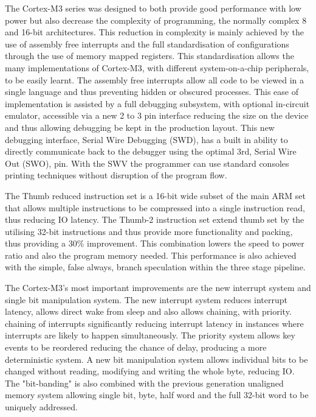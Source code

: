 The Cortex-M3 series was designed to both provide good performance with low power but also
decrease the complexity of programming, the normally complex 8 and 16-bit architectures. This
reduction in complexity is mainly achieved by the use of assembly free interrupts and the full
standardisation of configurations through the use of memory mapped registers. This standardisation
allows the many implementations of Cortex-M3, with different system-on-a-chip peripherals, to be
easily learnt. The assembly free interrupts allow all code to be viewed in a single language and thus
preventing hidden or obscured processes. This ease of implementation is assisted by a full debugging
subsystem, with optional in-circuit emulator, accessible via a new 2 to 3 pin interface reducing the
size on the device and thus allowing debugging be kept in the production layout. This new debugging
interface, Serial Wire Debugging (SWD), has a built in ability to directly communicate back to the
debugger using the optimal 3rd, Serial Wire Out (SWO), pin. With the SWV the programmer can use
standard consoles printing techniques without disruption of the program flow.


The Thumb reduced instruction set is a 16-bit wide subset of the main ARM set that allows multiple
instructions to be compressed into a single instruction read, thus reducing IO latency. The Thumb-2
instruction set extend thumb set by the utilising 32-bit instructions and thus provide more
functionality and packing, thus providing a 30\% improvement. This combination lowers the speed to
power ratio and also the program memory needed. This performance is also achieved with the
simple, false always, branch speculation within the three stage pipeline.


The Cortex-M3's most important improvements are the new interrupt system and single bit
manipulation system. The new interrupt system reduces interrupt latency, allows direct wake from
sleep and also allows chaining, with priority. chaining of interrupts significantly reducing interrupt
latency in instances where interrupts are likely to happen simultaneously. The priority system allows
key events to be reordered reducing the chance of delay, producing a more deterministic system. A
new bit manipulation system allows individual bits to be changed without reading, modifying and
writing the whole byte, reducing IO. The "bit-banding" is also combined with the previous
generation unaligned memory system allowing single bit, byte, half word and the full 32-bit word to
be uniquely addressed.


